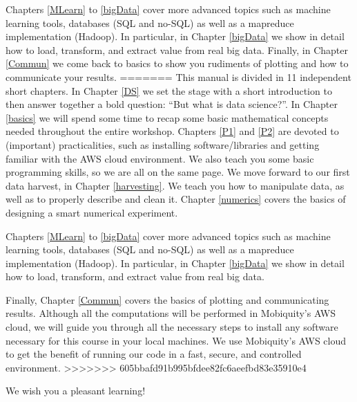 \documentclass[10pt]{PhDthesisPSnPDF}%
\begin{document}
Chapters \ref{MLearn} to \ref{bigData} cover more advanced topics such as machine learning tools, databases (SQL and no-SQL) as well as a mapreduce implementation (Hadoop). In particular, in Chapter \ref{bigData} we show in detail how to load, transform, and extract value from real big data. Finally, in Chapter \ref{Commun} we come back to basics to show you rudiments of plotting and how to communicate your results. 
=======
This manual is divided in 11 independent short chapters. In Chapter \ref{DS} we set the stage with a short introduction to then answer together a bold question: ``But what is data science?''. In Chapter \ref{basics} we will spend some time to recap some basic mathematical concepts needed throughout the entire workshop. Chapters \ref{P1} and \ref{P2} are devoted to (important) practicalities, such as installing software/libraries and getting familiar with the AWS cloud environment. We also teach you some basic programming skills, so we are all on the same page. We move forward to our first data harvest, in Chapter \ref{harvesting}. We teach you how to manipulate data, as well as to properly describe and clean it. Chapter \ref{numerics} covers the basics of designing a smart numerical experiment. 

Chapters \ref{MLearn} to \ref{bigData} cover more advanced topics such as machine learning tools, databases (SQL and no-SQL) as well as a mapreduce implementation (Hadoop). In particular, in Chapter \ref{bigData} we show in detail how to load, transform, and extract value from real big data.

Finally, Chapter \ref{Commun} covers the basics of plotting and communicating results. Although all the computations will be performed in Mobiquity's AWS cloud, we will guide you through all the necessary steps to install any software necessary for this course in your local machines. We use Mobiquity's AWS cloud to get the benefit of running our code in a fast, secure, and controlled environment.
>>>>>>> 605bbafd91b995bfdee82fc6aeefbd83e35910e4

We wish you a pleasant learning!

\newpage
\thispagestyle{empty}
\mbox{}
\cleardoublepage

\setcounter{tocdepth}{2}



\end{document}

